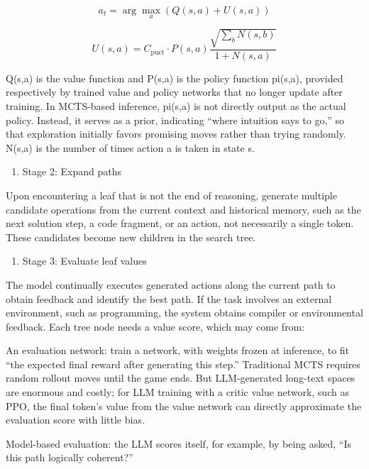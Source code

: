 \[
a_t=\arg\max_a\left(Q(s,a)+U(s,a)\right)
\]

\[
U(s,a)=C_{\mathrm{puct}}\cdot P(s,a)\frac{\sqrt{\sum_b N(s,b)}}{1+N(s,a)}
\]

Q(s,a) is the value function and P(s,a) is the policy function pi(s,a), provided respectively by trained value and policy networks that no longer update after training. In MCTS-based inference, pi(s,a) is not directly output as the actual policy. Instead, it serves as a prior, indicating ``where intuition says to go,'' so that exploration initially favors promising moves rather than trying randomly. N(s,a) is the number of times action a is taken in state s.

\begin{enumerate}
\def\labelenumi{(\arabic{enumi})}
\setcounter{enumi}{1}
\tightlist
\item
  Stage 2: Expand paths
\end{enumerate}

Upon encountering a leaf that is not the end of reasoning, generate multiple candidate operations from the current context and historical memory, such as the next solution step, a code fragment, or an action, not necessarily a single token. These candidates become new children in the search tree.

\begin{enumerate}
\def\labelenumi{(\arabic{enumi})}
\setcounter{enumi}{2}
\tightlist
\item
  Stage 3: Evaluate leaf values
\end{enumerate}

The model continually executes generated actions along the current path to obtain feedback and identify the best path. If the task involves an external environment, such as programming, the system obtains compiler or environmental feedback. Each tree node needs a value score, which may come from:

An evaluation network: train a network, with weights frozen at inference, to fit ``the expected final reward after generating this step.'' Traditional MCTS requires random rollout moves until the game ends. But LLM-generated long-text spaces are enormous and costly; for LLM training with a critic value network, such as PPO, the final token's value from the value network can directly approximate the evaluation score with little bias.

Model-based evaluation: the LLM scores itself, for example, by being asked, ``Is this path logically coherent?''

